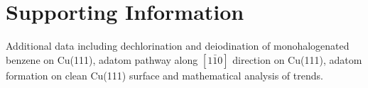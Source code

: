 \documentclass[aps,prb,reprint,amsmath,amssymb]{revtex4-1}
\newcommand{\sinfo}{Supporting Information}
\begin{document}


\section{\sinfo}



Additional data including dechlorination and deiodination of monohalogenated benzene on Cu(111), adatom pathway along $[1\bar{1}0]$ direction on Cu(111), adatom formation on clean Cu(111) surface and mathematical analysis of trends.






%
%




\end{document}

